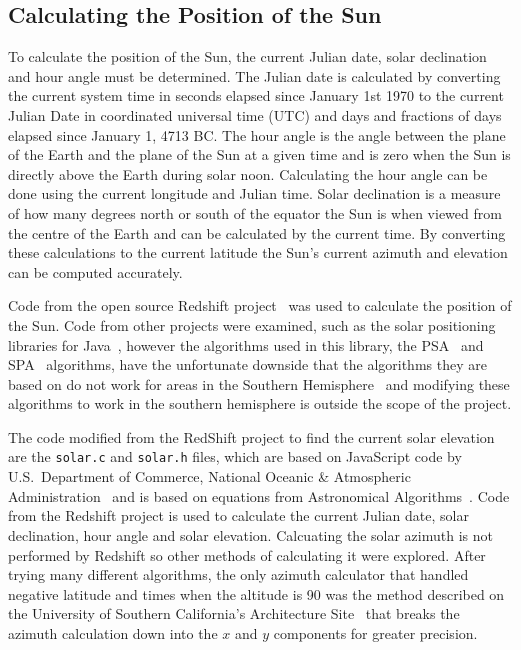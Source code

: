 \documentclass[12pt]{report}
\begin{document}
\subsection{Calculating the Position of the Sun}
To calculate the position of the Sun, the current Julian date, solar declination and hour angle must be determined. The Julian date is calculated by converting the current system time in seconds elapsed since January 1st 1970 to the current Julian Date in coordinated universal time (UTC) and days and fractions of days elapsed since January 1, 4713 BC. The hour angle is the angle between the plane of the Earth and the plane of the Sun at a given time and is zero when the Sun is directly above the Earth during solar noon. Calculating the hour angle can be done using the current longitude and Julian time. Solar declination is a measure of how many degrees north or south of the equator the Sun is when viewed from the centre of the Earth and can be calculated by the current time. By converting these calculations to the current latitude the Sun's current azimuth and elevation can be computed accurately.

Code from the open source Redshift project~\cite{redshift} was used to calculate the position of the Sun.  Code from other projects were examined, such as the solar positioning libraries for Java~\cite{javasunlib}, however the algorithms used in this library, the PSA~\cite{psa} and SPA~\cite{spa} algorithms, have the unfortunate downside that the algorithms they are based on do not work for areas in the Southern Hemisphere~\cite{southsun} and modifying these algorithms to work in the southern hemisphere is outside the scope of the project.

The code modified from the RedShift project to find the current solar elevation are the \texttt{solar.c} and \texttt{solar.h} files, which are based on JavaScript code by U.S.\ Department of Commerce, National Oceanic {\&} Atmospheric Administration~\cite{usnoaa} and is based on equations from Astronomical Algorithms~\cite{astronomicalalgorithms}. Code from the Redshift project is used to calculate the current Julian date, solar declination, hour angle and solar elevation. Calcuating the solar azimuth is not performed by Redshift so other methods of calculating it were explored. After trying many different algorithms, the only azimuth calculator that handled negative latitude and times when the altitude is 90{\degree} was the method described on the University of Southern California's Architecture Site~\cite{solarazi} that breaks the azimuth calculation down into the $x$ and $y$ components for greater precision.
\end{document}
